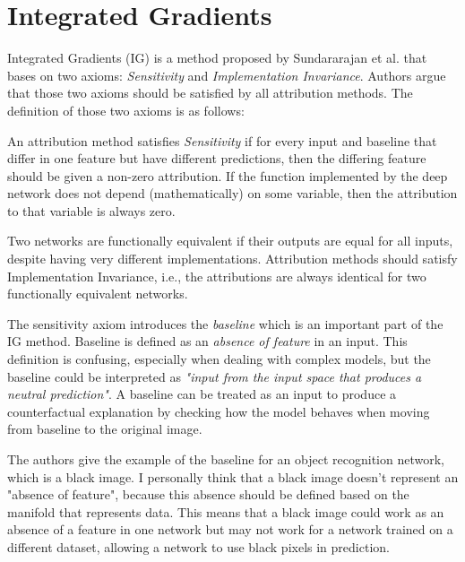 \section{Integrated Gradients}\label{section:ig}

Integrated Gradients (IG) \cite{sundararajan2017axiomatic} is a method proposed by Sundararajan et al. that bases on two axioms: \textit{Sensitivity} and \textit{Implementation Invariance}. Authors argue that those two axioms should be satisfied by all attribution methods. The definition of those two axioms is as follows:

\begin{definition}\label{axiom:sensitivity}
An attribution method satisfies \textit{Sensitivity} if for every input and baseline that differ in one feature but have different predictions, then the differing feature should be given a non-zero attribution. If the function implemented by the deep network does not depend (mathematically) on some variable, then the attribution to that variable is always zero.
\end{definition}

\begin{definition}\label{axiom:implementation-invariance}
Two networks are functionally equivalent if their outputs are equal for all inputs, despite having very different implementations. Attribution methods should satisfy Implementation Invariance, i.e., the attributions are always identical for two functionally equivalent networks.
\end{definition}

The sensitivity axiom introduces the \textit{baseline} which is an important part of the IG method. Baseline is defined as an \textit{absence of feature} in an input. This definition is confusing, especially when dealing with complex models, but the baseline could be interpreted as \textit{"input from the input space that produces a neutral prediction"}. A baseline can be treated as an input to produce a counterfactual explanation by checking how the model behaves when moving from baseline to the original image.

\begin{remark}
The authors give the example of the baseline for an object recognition network, which is a black image. I personally think that a black image doesn't represent an "absence of feature", because this absence should be defined based on the manifold that represents data. This means that a black image could work as an absence of a feature in one network but may not work for a network trained on a different dataset, allowing a network to use black pixels in prediction.
\end{remark}


